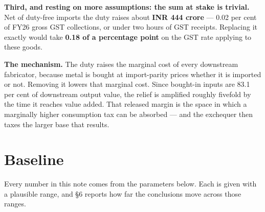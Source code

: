 \documentclass[11pt, a4paper]{article}
\begin{document}
\textbf{Third, and resting on more assumptions: the sum at stake is trivial.} Net of
duty-free imports the duty raises about \textbf{INR 444 crore} --- 0.02 per cent of
FY26 gross GST collections, or under two hours of GST receipts. Replacing it exactly
would take \textbf{0.18 of a percentage point} on the GST rate applying to these
goods.

\begin{keybox}
\textbf{The mechanism.} The duty raises the marginal cost of every downstream
fabricator, because metal is bought at import-parity prices whether it is imported or
not. Removing it lowers that marginal cost. Since bought-in inputs are 83.1 per cent
of downstream output value, the relief is amplified roughly fivefold by the time it
reaches value added. That released margin is the space in which a marginally higher
consumption tax can be absorbed --- and the exchequer then taxes the larger base that
results.
\end{keybox}

\section{Baseline}

Every number in this note comes from the parameters below. Each is given with a
plausible range, and §6 reports how far the conclusions move across those ranges.
\end{document}
